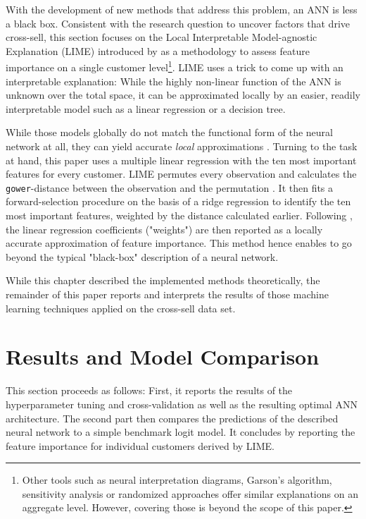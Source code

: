 \documentclass[12pt,a4paper]{article}
\let\code=\texttt
\begin{document}
With the development of new methods that address this problem, an ANN is less a black box.
Consistent with the research question to uncover factors that drive cross-sell, 
this section focuses on the Local Interpretable Model-agnostic Explanation (LIME) introduced by \cite{ribeiroWhyShouldTrust2016a} as a methodology
to assess feature importance on a single customer level\footnote{Other tools such as neural interpretation diagrams, Garson's algorithm, sensitivity analysis or randomized approaches
\citep{oldenIlluminatingBlackBox2002} offer similar explanations on an aggregate level. However, covering those is beyond the scope of this paper.}.
LIME uses a trick to come up with an interpretable explanation: While the highly non-linear function of the ANN is unknown over the total space,
it can be approximated locally by an easier, readily interpretable model such as a linear regression or a decision tree.

While those models globally do not match the functional form of the neural network at all, they can yield accurate \textit{local} approximations
\citep[see figure 3 for a visual example]{ribeiroWhyShouldTrust2016a}.
Turning to the task at hand, this paper uses a multiple linear regression with the ten most important features for every customer.
LIME permutes every observation and calculates the \code{gower}-distance between the observation and the permutation \citep{pedersenUnderstandingLime2018}.
It then fits a forward-selection procedure on the basis of a ridge regression \citep{pedersenPackageLimeLocal2018} to identify the ten most 
important features, weighted by the distance calculated earlier.
Following \cite{ribeiroWhyShouldTrust2016a}, the linear regression coefficients ("weights") are then reported as a locally accurate approximation of feature importance.
This method hence enables to go beyond the typical "black-box" description of a neural network.

While this chapter described the implemented methods theoretically, the remainder of this paper reports and interprets the results of those 
machine learning techniques applied on the cross-sell data set.

\section{Results and Model Comparison}
This section proceeds as follows: First, it reports the results of the hyperparameter tuning and cross-validation as well as the resulting optimal ANN architecture.
The second part then compares the predictions of the described neural network to a simple benchmark logit model.
It concludes by reporting the feature importance for individual customers derived by LIME.
\end{document}
